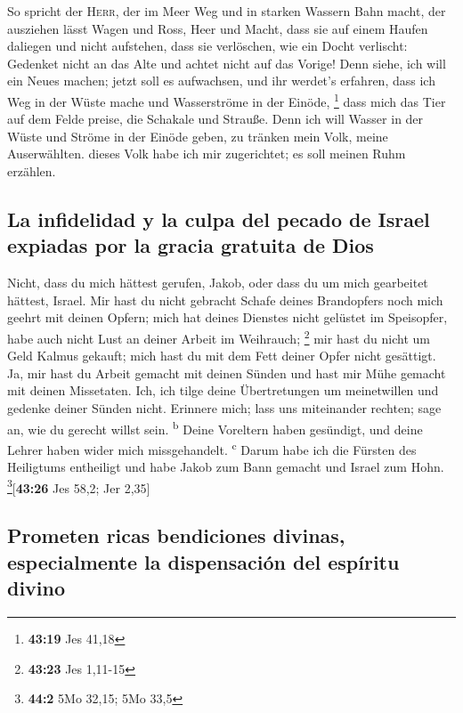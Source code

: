  So spricht der \textsc{Herr}, der im Meer Weg und in
starken Wassern Bahn macht,  der ausziehen lässt Wagen
und Ross, Heer und Macht, dass sie auf einem Haufen daliegen und nicht
aufstehen, dass sie verlöschen, wie ein Docht verlischt: 
Gedenket nicht an das Alte und achtet nicht auf das Vorige!
 Denn siehe, ich will ein Neues machen; jetzt soll es
aufwachsen, und ihr werdet's erfahren, dass ich Weg in der Wüste mache
und Wasserströme in der Einöde, \footnote{\textbf{43:19} Jes 41,18}
 dass mich das Tier auf dem Felde preise, die Schakale
und Strauße. Denn ich will Wasser in der Wüste und Ströme in der Einöde
geben, zu tränken mein Volk, meine Auserwählten.  dieses
Volk habe ich mir zugerichtet; es soll meinen Ruhm erzählen.

\hypertarget{la-infidelidad-y-la-culpa-del-pecado-de-israel-expiadas-por-la-gracia-gratuita-de-dios}{%
\subsection{La infidelidad y la culpa del pecado de Israel expiadas por
la gracia gratuita de
Dios}\label{la-infidelidad-y-la-culpa-del-pecado-de-israel-expiadas-por-la-gracia-gratuita-de-dios}}

 Nicht, dass du mich hättest gerufen, Jakob, oder dass du
um mich gearbeitet hättest, Israel.  Mir hast du nicht
gebracht Schafe deines Brandopfers noch mich geehrt mit deinen Opfern;
mich hat deines Dienstes nicht gelüstet im Speisopfer, habe auch nicht
Lust an deiner Arbeit im Weihrauch; \footnote{\textbf{43:23} Jes 1,11-15}
 mir hast du nicht um Geld Kalmus gekauft; mich hast du
mit dem Fett deiner Opfer nicht gesättigt. Ja, mir hast du Arbeit
gemacht mit deinen Sünden und hast mir Mühe gemacht mit deinen
Missetaten.  Ich, ich tilge deine Übertretungen um
meinetwillen und gedenke deiner Sünden nicht.  Erinnere
mich; lass uns miteinander rechten; sage an, wie du gerecht willst sein.
\textsuperscript{b}  Deine Voreltern haben gesündigt, und
deine Lehrer haben wider mich missgehandelt. \textsuperscript{c}
 Darum habe ich die Fürsten des Heiligtums entheiligt und
habe Jakob zum Bann gemacht und Israel zum Hohn.
\footnote{\textbf{44:2} 5Mo 32,15; 5Mo 33,5}{[}\textbf{43:26} Jes 58,2;
Jer 2,35{]}

\hypertarget{prometen-ricas-bendiciones-divinas-especialmente-la-dispensaciuxf3n-del-espuxedritu-divino}{%
\subsection{Prometen ricas bendiciones divinas, especialmente la
dispensación del espíritu
divino}\label{prometen-ricas-bendiciones-divinas-especialmente-la-dispensaciuxf3n-del-espuxedritu-divino}}

